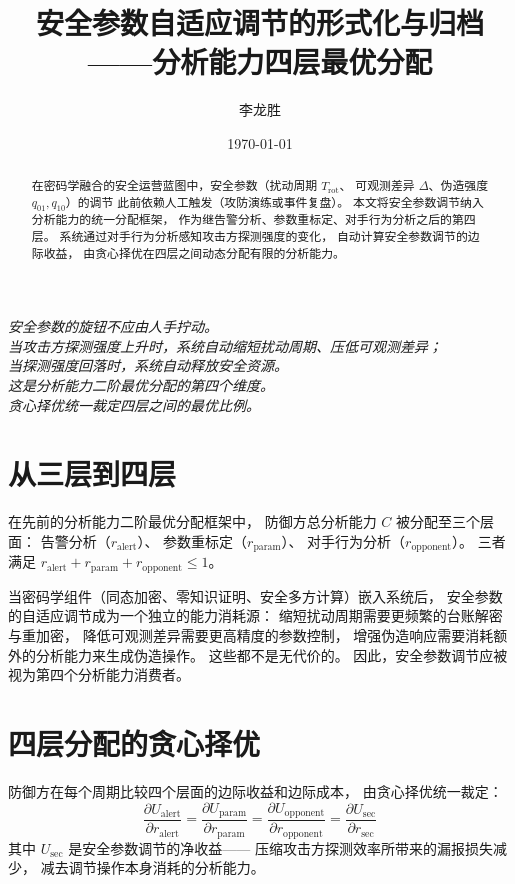 \documentclass[11pt,a4paper]{article}
\title{安全参数自适应调节的形式化与归档\\
——分析能力四层最优分配}
\author{李龙胜}
\date{\today}
\begin{document}
\maketitle

\begin{center}
\textit{
安全参数的旋钮不应由人手拧动。\\
当攻击方探测强度上升时，系统自动缩短扰动周期、压低可观测差异；\\
当探测强度回落时，系统自动释放安全资源。\\
这是分析能力二阶最优分配的第四个维度。\\
贪心择优统一裁定四层之间的最优比例。
}
\end{center}

\vspace{5mm}

\begin{abstract}
在密码学融合的安全运营蓝图中，安全参数（扰动周期 \(T_{\text{rot}}\)、
可观测差异 \(\Delta\)、伪造强度 \(q_{01}, q_{10}\)）的调节
此前依赖人工触发（攻防演练或事件复盘）。
本文将安全参数调节纳入分析能力的统一分配框架，
作为继告警分析、参数重标定、对手行为分析之后的第四层。
系统通过对手行为分析感知攻击方探测强度的变化，
自动计算安全参数调节的边际收益，
由贪心择优在四层之间动态分配有限的分析能力。
\end{abstract}

\tableofcontents

\section{从三层到四层}

在先前的分析能力二阶最优分配框架中，
防御方总分析能力 \(C\) 被分配至三个层面：
告警分析（\(r_{\text{alert}}\)）、
参数重标定（\(r_{\text{param}}\)）、
对手行为分析（\(r_{\text{opponent}}\)）。
三者满足 \(r_{\text{alert}} + r_{\text{param}} + r_{\text{opponent}} \le 1\)。

当密码学组件（同态加密、零知识证明、安全多方计算）嵌入系统后，
安全参数的自适应调节成为一个独立的能力消耗源：
缩短扰动周期需要更频繁的台账解密与重加密，
降低可观测差异需要更高精度的参数控制，
增强伪造响应需要消耗额外的分析能力来生成伪造操作。
这些都不是无代价的。
因此，安全参数调节应被视为第四个分析能力消费者。

\section{四层分配的贪心择优}

防御方在每个周期比较四个层面的边际收益和边际成本，
由贪心择优统一裁定：
\[
\frac{\partial U_{\text{alert}}}{\partial r_{\text{alert}}} =
\frac{\partial U_{\text{param}}}{\partial r_{\text{param}}} =
\frac{\partial U_{\text{opponent}}}{\partial r_{\text{opponent}}} =
\frac{\partial U_{\text{sec}}}{\partial r_{\text{sec}}}
\]
其中 \(U_{\text{sec}}\) 是安全参数调节的净收益——
压缩攻击方探测效率所带来的漏报损失减少，
减去调节操作本身消耗的分析能力。
\end{document}
